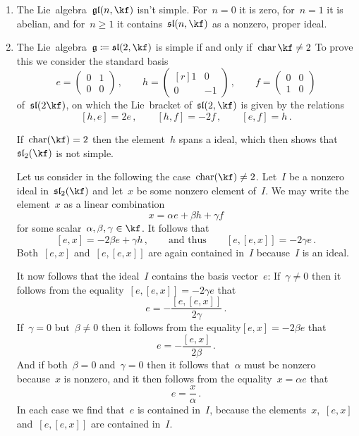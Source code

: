 \begin{examples}
  \leavevmode
  \begin{enumerate}
    \item
      The Lie~algebra~$\gllie(n, \kf)$ isn’t simple.
      For~$n = 0$ it is zero, for~$n = 1$ it is abelian, and for~$n \geq 1$ it contains~$\sllie(n,\kf)$ as a nonzero, proper ideal.
    \item
      The Lie~algebra~$\glie \defined \sllie(2, \kf)$ is simple if and only if~$\ringchar \kf \neq 2$
      To prove this we consider the standard basis
      \[
        e
        =
        \begin{pmatrix}
          0 & 1 \\
          0 & 0
        \end{pmatrix} \,,
        \qquad
        h
        =
        \begin{pmatrix*}[r]
          1 &  0  \\
          0 & -1
        \end{pmatrix*} \,,
        \qquad
        f
        =
        \begin{pmatrix}
          0 & 0 \\
          1 & 0
        \end{pmatrix}
      \]
      of~$\sllie(2 \kf)$, on which the Lie~bracket of~$\sllie(2, \kf)$ is given by the relations
      \[
        [h,e] = 2e  \,,
        \qquad
        [h,f] = -2 f \,,
        \qquad
        [e,f] = h \,.
      \]
      
      If~$\ringchar(\kf) = 2$ then the element~$h$ spans a {\onedimensional} ideal, which then shows that~$\sllie_2(\kf)$ is not simple.
      
      Let us consider in the following the case~$\ringchar(\kf) \neq 2$.
      Let~$I$ be a nonzero ideal in~$\sllie_2(\kf)$ and let~$x$ be some nonzero element of~$I$.
      We may write the element~$x$ as a linear combination
      \[
        x = \alpha e + \beta h + \gamma f
      \]
      for some scalar~$\alpha, \beta, \gamma \in \kf$.
      It follows that
      \[
        [e,x]
        =
        -2 \beta e + \gamma h \,,
        \qquad \text{and thus}\qquad
        [e,[e,x]]
        =
        -2 \gamma e \,.
      \]
      Both~$[e,x]$ and~$[e,[e,x]]$ are again contained in~$I$ because~$I$ is an ideal.

      It now follows that the ideal~$I$ contains the basis vector~$e$:
      If~$\gamma \neq 0$ then it follows from the equality~$[e,[e,x]] = -2 \gamma e$ that
      \[
        e
        =
        - \frac{ [e,[e,x]] }{ 2\gamma } \,.
      \]
      If~$\gamma = 0$ but~$\beta \neq 0$ then it follows from the equality$[e,x] = -2 \beta e$ that
      \[
        e
        =
        -\frac{ [e,x] }{ 2\beta } \,.
      \]
      And if both~$\beta = 0$ and~$\gamma = 0$ then it follows that~$\alpha$ must be nonzero because~$x$ is nonzero, and it then follows from the equality~$x = \alpha e$ that
      \[
        e = \frac{x}{\alpha} \,.
      \]
      In each case we find that~$e$ is contained in~$I$, because the elements~$x$,~$[e,x]$ and~$[e,[e,x]]$ are contained in~$I$.
      

\end{enumerate}
\end{examples}
